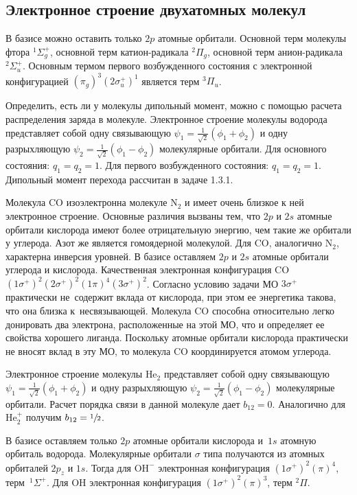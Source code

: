 \subsection{Электронное строение двухатомных молекул}
 В базисе можно оставить только $2p$ атомные орбитали. Основной терм молекулы фтора $^1\Sigma_g^+$, основной терм катион-радикала $^2\Pi_g$, основной терм анион-радикала $^2\Sigma_u^+$. Основным термом первого возбужденного состояния с электронной конфигурацией $(\pi_g)^3(2\sigma_u^+)^1$ является терм $^3\Pi_u$.\par
{} Определить, есть ли у молекулы дипольный момент, можно с помощью расчета распределения заряда в молекуле. Электронное строение молекулы водорода представляет собой одну связывающую $\psi_1=\frac{1}{\sqrt2}(\phi_1+\phi_2)$ и одну разрыхляющую $\psi_2=\frac{1}{\sqrt2}(\phi_1-\phi_2)$ молекулярные орбитали. Для основного состояния: $q_1=q_2=1$. Для первого возбужденного состояния: $q_1=q_2=1$. Дипольный момент перехода рассчитан в задаче 1.3.1.\par
{} Молекула CO изоэлектронна молекуле N$_2$ и имеет очень близкое к ней электронное строение. Основные различия вызваны тем, что $2p$ и $2s$ атомные орбитали кислорода имеют более отрицательную энергию, чем такие же орбитали у углерода. Азот же является гомоядерной молекулой. Для CO, аналогично N$_2$, характерна инверсия уровней. В базисе оставляем $2p$ и $2s$ атомные орбитали углерода и кислорода. Качественная электронная конфигурация CO~$(1\sigma^+)^2(2\sigma^+)^2(1\pi)^4(3\sigma^+)^2$. Согласно условию задачи МО $3\sigma^+$ практически не~содержит вклада от кислорода, при этом ее энергетика такова, что она близка к~несвязывающей. Молекула CO способна относительно легко донировать два электрона, расположенные на этой МО, что и определяет ее свойства хорошего лиганда. Поскольку атомные орбитали кислорода практически не вносят вклад в эту МО, то молекула CO координируется атомом углерода.\par
{} Электронное строение молекулы $\text{He}_2$ представляет собой одну связывающую $\psi_1=\frac{1}{\sqrt2}(\phi_1+\phi_2)$ и одну разрыхляющую $\psi_2=\frac{1}{\sqrt2}(\phi_1-\phi_2)$ молекулярные орбитали. Расчет порядка связи в данной молекуле дает $b_{12}=0$. Аналогично для $\text{He}_2^{+}$ получим $b_{12}=\sfrac12$.\par
{} В базисе оставляем только $2p$ атомные орбитали кислорода и~$1s$ атомную орбиталь водорода. Молекулярные орбитали $\sigma$ типа получаются из атомных орбиталей $2p_z$ и $1s$. Тогда для $\text{OH}^-$ электронная конфигурация $(1\sigma^+)^2(\pi)^4$, терм~$^1\Sigma^+$. Для $\text{OH}$ электронная конфигурация $(1\sigma^+)^2(\pi)^3$, терм $^2\Pi$.\par
